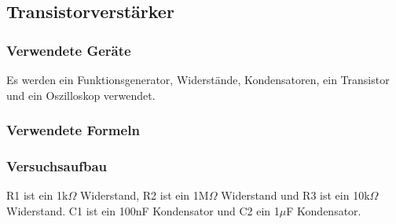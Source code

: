 \documentclass[12pt,a4paper]{article}
\begin{document}
\subsection{Transistorverstärker}
\subsubsection{Verwendete Geräte}

Es werden ein Funktionsgenerator, Widerstände, Kondensatoren, ein Transistor und ein Oszilloskop verwendet.

\subsubsection{Verwendete Formeln}
\subsubsection{Versuchsaufbau}

R1 ist ein 1k$\Omega$ Widerstand, R2 ist ein 1M$\Omega$ Widerstand und R3 ist ein 10k$\Omega$ Widerstand. C1 ist ein 100nF Kondensator und C2 ein 1$\mu$F Kondensator.
\end{document}
